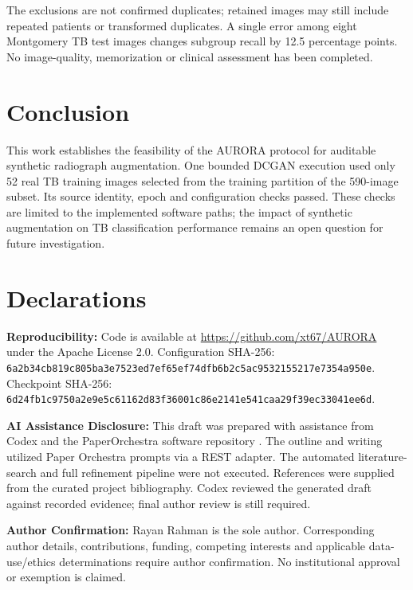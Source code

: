 \documentclass[11pt]{article}
\begin{document}
The exclusions are not confirmed duplicates; retained images may still include repeated patients or transformed duplicates. A single error among eight Montgomery TB test images changes subgroup recall by 12.5 percentage points. No image-quality, memorization or clinical assessment has been completed.

\section{Conclusion}
This work establishes the feasibility of the AURORA protocol for auditable synthetic radiograph augmentation. One bounded DCGAN execution used only 52 real TB training images selected from the training partition of the 590-image subset. Its source identity, epoch and configuration checks passed. These checks are limited to the implemented software paths;  the impact of synthetic augmentation on TB classification performance remains an open question for future investigation.

\section*{Declarations}
\textbf{Reproducibility:} Code is available at \url{https://github.com/xt67/AURORA} under the Apache License 2.0. Configuration SHA-256: \nolinkurl{6a2b34cb819c805ba3e7523ed7ef65ef74dfb6b2c5ac9532155217e7354a950e}. Checkpoint SHA-256: \nolinkurl{6d24fb1c9750a2e9e5c61162d83f36001c86e2141e541caa29f39ec33041ee6d}.

\textbf{AI Assistance Disclosure:} This draft was prepared with assistance from Codex and the PaperOrchestra software repository \cite{paperorchestra}. The outline and writing utilized Paper Orchestra prompts via a REST adapter. The automated literature-search and full refinement pipeline were not executed. References were supplied from the curated project bibliography. Codex reviewed the generated draft against recorded evidence; final author review is still required.

\textbf{Author Confirmation:} Rayan Rahman is the sole author. Corresponding author details, contributions, funding, competing interests and applicable data-use/ethics determinations require author confirmation. No institutional approval or exemption is claimed.



\end{document}
